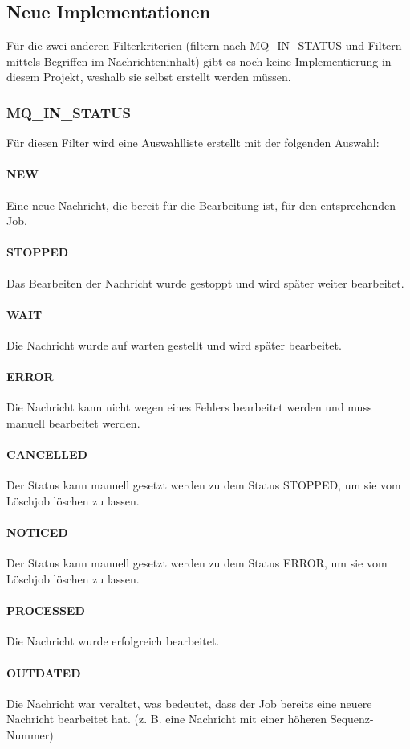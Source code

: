 \subsection{Neue Implementationen}
Für die zwei anderen Filterkriterien (filtern nach MQ\_IN\_STATUS und Filtern mittels Begriffen im Nachrichteninhalt) gibt es noch keine Implementierung in diesem Projekt, weshalb sie selbst erstellt werden müssen.

\subsubsection{MQ\_IN\_STATUS}
Für diesen Filter wird eine Auswahlliste erstellt mit der folgenden Auswahl:

\paragraph{NEW} Eine neue Nachricht, die bereit für die Bearbeitung ist, für den entsprechenden Job.
\paragraph{STOPPED} Das Bearbeiten der Nachricht wurde gestoppt und wird später weiter bearbeitet.
\paragraph{WAIT} Die Nachricht wurde auf warten gestellt und wird später bearbeitet.
\paragraph{ERROR} Die Nachricht kann nicht wegen eines Fehlers bearbeitet werden und muss manuell bearbeitet werden.
\paragraph{CANCELLED} Der Status kann manuell gesetzt werden zu dem Status STOPPED, um sie vom Löschjob löschen zu lassen.
\paragraph{NOTICED} Der Status kann manuell gesetzt werden zu dem Status ERROR, um sie vom Löschjob löschen zu lassen.
\paragraph{PROCESSED} Die Nachricht wurde erfolgreich bearbeitet.
\paragraph{OUTDATED} Die Nachricht war veraltet, was bedeutet, dass der Job bereits eine neuere Nachricht bearbeitet hat. (z. B. eine Nachricht mit einer höheren Sequenz-Nummer)\newline

